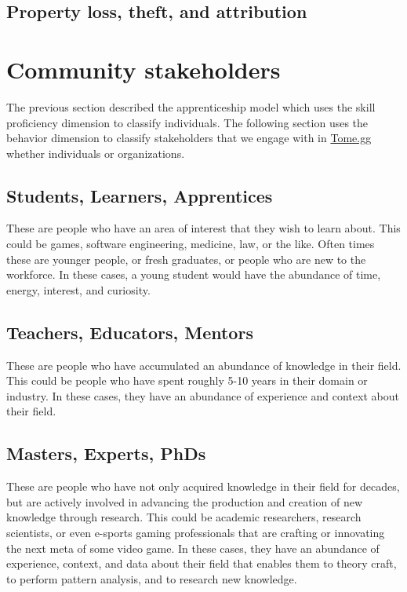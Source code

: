 \documentclass[journal, onecolumn]{IEEEtran}
\newcommand{\tomegg}{
  \href{http://tome.gg}{Tome.gg}
}
\begin{document}
\subsection{Property loss, theft, and attribution}

\section{Community stakeholders}
\label{sec:stakeholders}

The previous section described the apprenticeship model which uses the 
skill proficiency dimension to classify individuals.
The following section uses the behavior dimension to classify stakeholders
that we engage with in \tomegg whether individuals or organizations.

\subsection{Students, Learners, Apprentices}

These are people who have an area of interest that they wish to learn
about. This could be games, software engineering, medicine, law, or the like.
Often times these are younger people, or fresh graduates, or people who are
new to the workforce. In these cases, a young student would have the abundance of 
time, energy, interest, and curiosity.

\subsection{Teachers, Educators, Mentors}

These are people who have accumulated an abundance of knowledge in their field.
This could be people who have spent roughly 5-10 years in their domain or industry.
In these cases, they have an abundance of experience and context about their
field.

\subsection{Masters, Experts, PhDs}

These are people who have not only acquired knowledge in their field for decades,
but are actively involved in advancing the production and creation of new 
knowledge through research. This could be academic researchers, research scientists,
or even e-sports gaming professionals that are crafting or innovating the next meta of 
some video game. In these cases, they have an abundance of experience, context, and
data about their field that enables them to theory craft, to perform pattern analysis,
and to research new knowledge.
\end{document}
